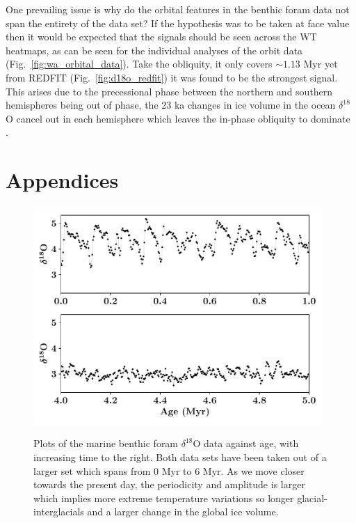 \documentclass[12pt, onecolumn]{revtex4}    %
\begin{document}
One prevailing issue is why do the orbital features in the benthic foram data not span the entirety of the data set? If the hypothesis was to be taken at face value then it would be expected that the signals should be seen across the WT heatmaps, as can be seen for the individual analyses of the orbit data (Fig.~\ref{fig:wa_orbital_data}). Take the obliquity, it only covers $\sim 1.13$ Myr yet from REDFIT (Fig.~\ref{fig:d18o_redfit}) it was found to be the strongest signal. This arises due to the precessional phase between the northern and southern hemispheres being out of phase, the 23 ka changes in ice volume in the ocean $\delta^{18}$O cancel out in each hemisphere which leaves the in-phase obliquity to dominate \cite{raymo_plio}. \\



\newpage





\newpage

\section*{Appendices}
\begin{figure}[!h]
\begin{center}
\includegraphics[width=11cm]{figures/foram_data}
\caption[]{Plots of the marine benthic foram $\delta^{18}$O data against age, with increasing time to the right. Both data sets have been taken out of a larger set which spans from 0 Myr to 6 Myr. As we move closer towards the present day, the periodicity and amplitude is larger which implies more extreme temperature variations so longer glacial-interglacials and a larger change in the global ice volume.}
\vspace{-3ex}
\label{fig:foram_data}
\end{center}
\end{figure}
\end{document}
